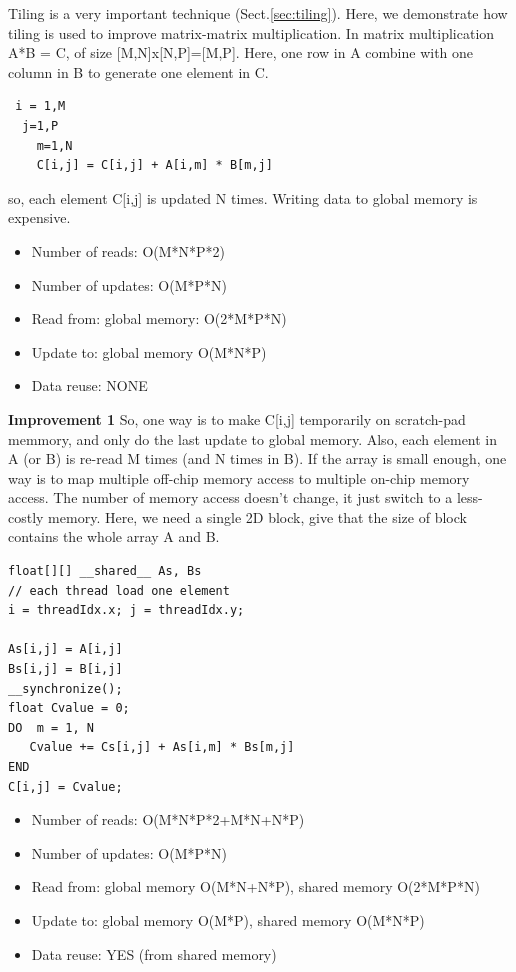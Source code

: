 Tiling is a very important technique (Sect.\ref{sec:tiling}). Here, we
demonstrate how tiling is used to improve matrix-matrix multiplication. In
matrix multiplication A*B = C, of size [M,N]x[N,P]=[M,P]. Here, one row 
in A combine with one column in B to generate one element in C.
\begin{lstlisting}
 i = 1,M
  j=1,P
    m=1,N
    C[i,j] = C[i,j] + A[i,m] * B[m,j]
\end{lstlisting}
so, each element C[i,j] is updated N times. Writing data to global memory is
expensive. 
\begin{itemize}
  \item Number of reads: O(M*N*P*2)
  \item Number of updates: O(M*P*N)
  \item Read from: global memory: O(2*M*P*N)
  \item Update to: global memory O(M*N*P)
  \item Data reuse: NONE
\end{itemize}

{\bf Improvement 1}
So, one way is to make C[i,j] temporarily on scratch-pad memmory, and
only do the last update to global memory. Also, each element in A (or B) is
re-read M times (and N times in B). If the array is small enough, one way is 
to map multiple off-chip memory access to multiple on-chip memory access. 
The number  of memory access doesn't change, it
just switch to a less-costly memory. Here, we need a single 2D block,
give that the size of block contains the whole array A and B.
\begin{lstlisting}
float[][] __shared__ As, Bs
// each thread load one element
i = threadIdx.x; j = threadIdx.y;

As[i,j] = A[i,j]
Bs[i,j] = B[i,j]
__synchronize();
float Cvalue = 0;
DO  m = 1, N
   Cvalue += Cs[i,j] + As[i,m] * Bs[m,j]
END
C[i,j] = Cvalue;
\end{lstlisting}

\begin{itemize}
  \item Number of reads: O(M*N*P*2+M*N+N*P)
  \item Number of updates: O(M*P*N)
  \item Read from: global memory O(M*N+N*P), shared memory O(2*M*P*N)
  \item Update to: global memory O(M*P), shared memory O(M*N*P)
  \item Data reuse: YES (from shared memory)
\end{itemize}

